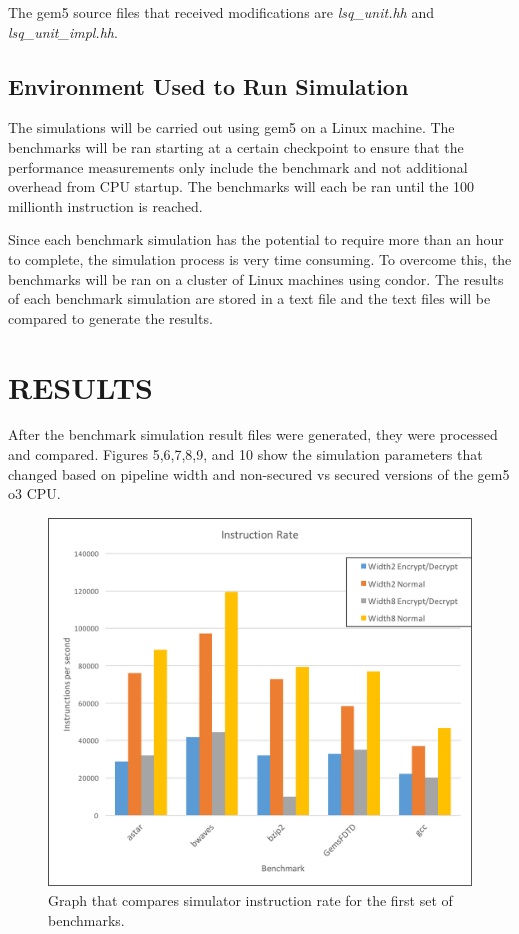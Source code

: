 \documentclass[letterpaper, 10 pt, conference]{ieeeconf}  %
\begin{document}
The gem5 source files that received modifications are \emph{lsq\_unit.hh} and \emph{lsq\_unit\_impl.hh}.
  

\subsection{Environment Used to Run Simulation}

The simulations will be carried out using gem5 on a Linux machine.  The benchmarks will be ran starting at a certain checkpoint to ensure that the performance measurements only include the benchmark and not additional overhead from CPU startup.  The benchmarks will each be ran  until the 100 millionth instruction is reached.

Since each benchmark simulation has the potential to require more than an hour to complete, the simulation process is very time consuming.  To overcome this, the benchmarks will be ran on a cluster of Linux machines using condor.  The results of each benchmark simulation are stored in a text file and the text files will be compared to generate the results.   

\section{RESULTS}

After the benchmark simulation result files were generated, they were processed and compared.  Figures 5,6,7,8,9, and 10 show the simulation parameters that changed based on pipeline width and non-secured vs secured versions of the gem5 o3 CPU.

\begin{figure}[thpb]
	\centering
	\includegraphics[scale=.45]{InstructionRate1}
   \caption{Graph that compares simulator instruction rate for the first set of benchmarks.}
\end{figure}
\end{document}
